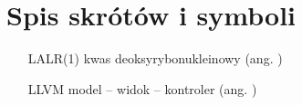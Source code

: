 \chapter{Spis skrótów i symboli}

\begin{itemize}
\item[LALR(1)] kwas deoksyrybonukleinowy (ang. )
\item[LLVM] model -- widok -- kontroler (ang. ) 
\end{itemize}
